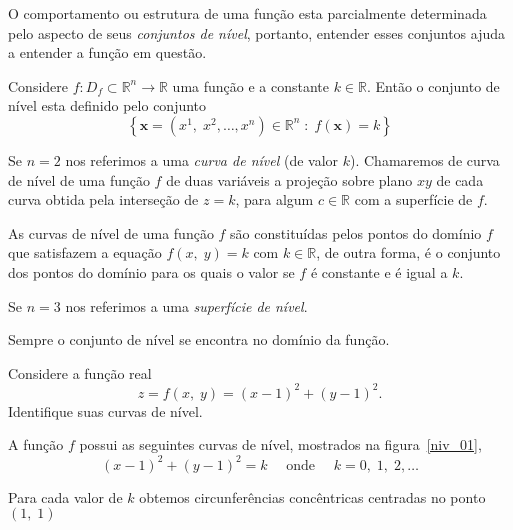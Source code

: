 O comportamento ou estrutura de uma função esta parcialmente determinada pelo aspecto de seus \emph{conjuntos de nível}, portanto, entender esses conjuntos ajuda a entender a função em questão.

\begin{defi}\label{new03}
	Considere $f\colon D_f\subset \mathbb{R}^n\to \mathbb{R}$ uma função e a constante $k\in \mathbb{R}$. Então o conjunto de nível
	esta definido pelo conjunto
	\begin{equation*}
		\left\{\mathbf{x}=(x^{1}, \; x^{2},\ldots,x^{n})\in \mathbb{R}^{n} \; \colon\;  f(\mathbf{x})=k \right\}
	\end{equation*}
\end{defi}

\begin{rema}
	Se $n=2$ nos referimos a uma \emph{curva de nível} (de valor $k$). Chamaremos de curva de nível de uma função \(f\) de duas variáveis a projeção sobre plano \(xy\) de cada curva obtida pela interseção de \(z=k\), para algum \(c \in \mathbb{R}\) com a superfície de \(f\).
	
	As curvas de nível de uma função \(f\) são constituídas pelos pontos do domínio \(f\)
	que satisfazem a equação \(f(x,\;y)=k\) com \( k \in \mathbb{R}\), de outra forma, é o conjunto dos pontos do domínio para os quais  o valor se \(f\) é constante e é igual a \(k\).
	
	Se $n=3$ nos referimos a uma \emph{superfície de nível}.
	
	Sempre o conjunto de nível se encontra no domínio da função.
\end{rema}

\begin{exer}\label{exe:2-1}
	Considere a  função real 
	\begin{equation*}
		z=f(x, \; y)=(x-1)^2+(y-1)^{2}.
	\end{equation*} 
	Identifique suas curvas de nível.
\end{exer}

\solo A função $f$ possui as seguintes curvas de nível, mostrados na figura~\ref{niv_01},
\begin{equation*}
	(x-1)^2+(y-1)^2=k\quad \text{ onde }\quad k=0,\; 1, \; 2,\ldots
\end{equation*}

Para cada valor de $k$ obtemos circunferências concêntricas centradas no ponto $(1,\;1)$

